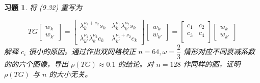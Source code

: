 \documentclass{ctexart}
\newtheorem{ex}{习题}
\begin{document}
\begin{ex}
    将 (9.32) 重写为

    \begin{equation}
        TG
        \begin{bmatrix}
            w_k
            \\
            w_{k'}
        \end{bmatrix}
        = 
        \begin{bmatrix}
            \lambda_k^{\nu_1+\nu_2}s_k & \lambda_k^{\nu_1}\lambda_{k'}^{\nu_2}s_k\\
            \lambda_{k'}^{\nu_1}\lambda_k^{\nu_2}c_k & \lambda_{k'}^{\nu_1+\nu_2}c_k
        \end{bmatrix}
        \begin{bmatrix}
            w_k
            \\
            w_{k'}
        \end{bmatrix}
        =
        \begin{bmatrix}
            c_1 & c_2 \\
            c_3 & c_4 \\
        \end{bmatrix}
        \begin{bmatrix}
            w_k
            \\
            w_{k'}
        \end{bmatrix}
    \end{equation}
    解释 $c_i$ 很小的原因。通过作出双网格校正 $n=64,\omega = \dfrac 23$ 情形对应不同衰减系数的的六个图像，导出 $\rho(TG)\approx 0.1$ 的结论。对 $n=128$ 作同样的图，证明 $\rho(TG)$ 与 $n$ 的大小无关。
\end{ex}
\end{document}
